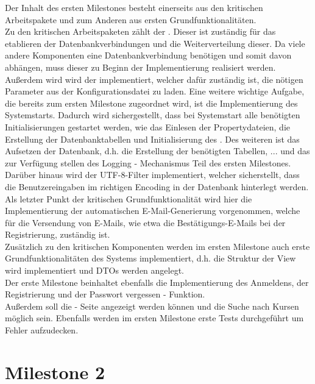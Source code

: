 Der Inhalt des ersten Milestones besteht einerseits aus den kritischen Arbeitspakete und zum Anderen aus
ersten Grundfunktionalitäten.\\
Zu den kritischen Arbeitspaketen zählt der . Dieser ist zuständig für das etablieren der Datenbankverbindungen und die Weiterverteilung dieser. Da viele andere Komponenten eine Datenbankverbindung benötigen und somit davon abhängen, muss dieser zu Beginn der Implementierung realisiert werden.\\
Außerdem wird wird der  implementiert, welcher dafür zuständig ist, die nötigen Parameter aus der Konfigurationsdatei zu laden.
Eine weitere wichtige Aufgabe, die bereits zum ersten Milestone zugeordnet wird, ist die
Implementierung des Systemstarts. Dadurch wird sichergestellt, dass bei Systemstart alle
benötigten Initialisierungen gestartet werden, wie das Einlesen der Propertydateien, die Erstellung der Datenbanktabellen und Initialisierung des .
Des weiteren ist das Aufsetzen der Datenbank, d.h. die Erstellung der benötigten Tabellen, ... und das zur Verfügung stellen des Logging - Mechanismus Teil des ersten Milestones.\\
Darüber hinaus wird der  UTF-8-Filter implementiert, welcher sicherstellt, dass die Benutzereingaben
im richtigen Encoding in der Datenbank hinterlegt werden.\\
Als letzter Punkt der kritischen Grundfunktionalität wird hier die Implementierung der automatischen E-Mail-Generierung vorgenommen, welche für die Versendung von E-Mails, wie etwa die Bestätigungs-E-Mails bei der Registrierung, zuständig ist.\\ 
Zusätzlich zu den kritischen Komponenten werden im ersten Milestone auch erste Grundfunktionalitäten des Systems implementiert, d.h. die Struktur der View wird implementiert und DTOs werden angelegt.\\
Der erste Milestone beinhaltet ebenfalls die Implementierung des Anmeldens, der Registrierung und der Passwort vergessen - Funktion.\\
Außerdem soll die  - Seite angezeigt werden können und die Suche nach Kursen möglich sein.
Ebenfalls werden im ersten Milestone erste Tests durchgeführt um Fehler aufzudecken.\\

\section{Milestone 2}

